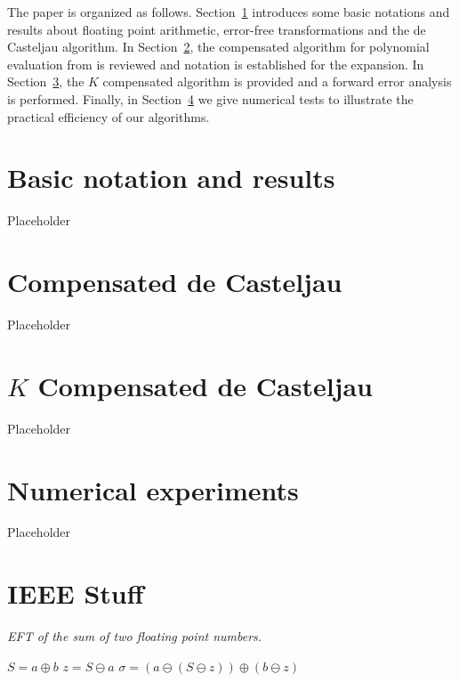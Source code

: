 \documentclass[letterpaper,10pt]{article}
\begin{document}
The paper is organized as follows. Section~\ref{notation} introduces some
basic notations and results about floating point arithmetic, error-free
transformations and the de Casteljau algorithm. In Section~\ref{compensated-2},
the compensated algorithm for polynomial evaluation from \cite{Jiang2010} is
reviewed and notation is established for the expansion. In
Section~\ref{compensated-k}, the \(K\) compensated algorithm is provided and
a forward error analysis is performed. Finally, in Section~\ref{numerical} we
give numerical tests to illustrate the practical efficiency of our algorithms.

\section{Basic notation and results}\label{notation}

Placeholder

\section{Compensated de Casteljau}\label{compensated-2}

Placeholder

\section{\texorpdfstring{\(K\)}{K} Compensated de Casteljau}\label{compensated-k}

Placeholder

\section{Numerical experiments}\label{numerical}

Placeholder

\section{IEEE Stuff}

\begin{algorithm}[H]
  \caption{\textit{EFT of the sum of two floating point numbers.}}

  \begin{algorithmic}
      \State \(S = a \oplus b\)
      \State \(z = S \ominus a\)
      \State \(\sigma = (a \ominus (S \ominus z)) \oplus (b \ominus z)\)
    \EndFunction
  \end{algorithmic}
\end{algorithm}
\end{document}
